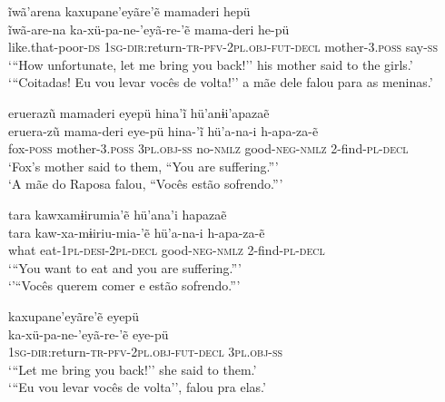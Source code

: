 \documentclass[output=paper,
modfonts,nonflat
]{langsci/langscibook}
\begin{document}
\ea   ĩwã'arena kaxupane'eyãre'ẽ mamaderi hepü  \\[.3em]
\gll 	ĩwã-are-na ka-xü-pa-ne-'eyã-re-'ẽ mama-deri he-pü\\
like.that-poor-\textsc{ds} \textsc{1sg-dir:}return-\textsc{tr-pfv-2pl.obj-fut-decl} mother-\textsc{3.poss} say-\textsc{ss}\\
\glt    `{``}How unfortunate, let me bring you back!'' his mother said to the girls.' \\
 `{``}Coitadas! Eu vou levar vocês de volta!'' a mãe dele falou para as meninas.'
\z  

\ea   eruerazũ mamaderi eyepü hina'ĩ hü'anɨi'apazaẽ  \\[.3em]
\gll 	 eruera-zũ mama-deri eye-pü hina-'ĩ hü'a-na-i h-apa-za-ẽ \\
fox-\textsc{poss} mother-\textsc{3.poss} \textsc{3pl.obj-ss} no-\textsc{nmlz} good-\textsc{neg-nmlz} 2-find-\textsc{pl-decl}\\
\glt   `Fox's mother said to them, ``You are suffering.{''}'\\
`A mãe do Raposa falou, ``Vocês estão sofrendo.{''}'\\
\z  

\ea   tara kawxamɨirumia'ẽ hü'ana'i hapazaẽ \\[.3em]
\gll 	tara kaw-xa-mɨiriu-mia-'ẽ hü'a-na-i h-apa-za-ẽ\\
what eat-\textsc{1pl-desi-2pl-decl} good-\textsc{neg-nmlz} 2-find-\textsc{pl-decl}\\
\glt   `{``}You want to eat and you are suffering.{''}' \\
`'{}``Vocês querem comer e estão sofrendo.{''}'\\
\z 


\ea     kaxupane'eyãre'ẽ eyepü  \\[.3em]
\gll 	 ka-xü-pa-ne-'eyã-re-'ẽ eye-pü\\
\textsc{1sg-dir:}return-\textsc{tr-pfv-2pl.obj-fut-decl} \textsc{3pl.obj-ss}\\
\glt    `{``}Let me bring you back!'' she said to them.' \\
`{``}Eu vou levar vocês de volta'', falou pra elas.'\\
\z  
\end{document}
